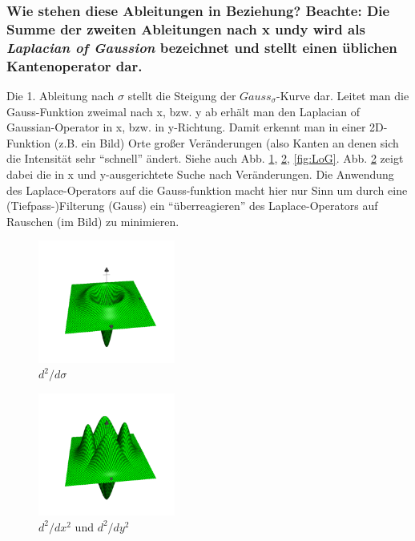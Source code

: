 \subsubsection*{Wie stehen diese Ableitungen in Beziehung? Beachte: Die Summe der zweiten Ableitungen nach x undy wird als \emph{Laplacian of Gaussion} bezeichnet und stellt einen \"ublichen Kantenoperator dar.}

Die 1. Ableitung nach $\sigma$ stellt die Steigung der $Gauss_{\sigma}$-Kurve dar. Leitet man die Gauss-Funktion zweimal nach x, bzw. y ab erh\"alt man den Laplacian of Gaussian-Operator in x, bzw. in y-Richtung.
Damit erkennt man in einer 2D-Funktion (z.B. ein Bild) Orte gro{\ss}er Ver\"anderungen (also Kanten an denen sich die Intensit\"at sehr ``schnell'' \"andert.
Siehe auch Abb. \ref{fig:1Abl}, \ref{fig:2Abl}, \ref{fig:LoG}.
Abb. \ref{fig:2Abl} zeigt dabei die in x und y-ausgerichtete Suche nach Ver\"anderungen. Die Anwendung des  Laplace-Operators auf die Gauss-funktion macht hier nur Sinn um durch eine (Tiefpass-)Filterung (Gauss) ein ``\"uberreagieren'' des Laplace-Operators auf Rauschen (im Bild) zu minimieren.

\begin{figure}[p] %
   \centering
   \includegraphics[width=0.4\textwidth]{Uebung6/1Abl_sigma.pdf} 
   \caption{$d^{2}/d\sigma$}
   \label{fig:1Abl}
\end{figure}

\begin{figure}[p] %
   \centering
   \includegraphics[width=0.4\textwidth]{Uebung6/2Abl_xy.pdf} 
   \caption{$d^{2}/dx^{2}$ und $d^{2}/dy^{2}$}
   \label{fig:2Abl}
\end{figure}

